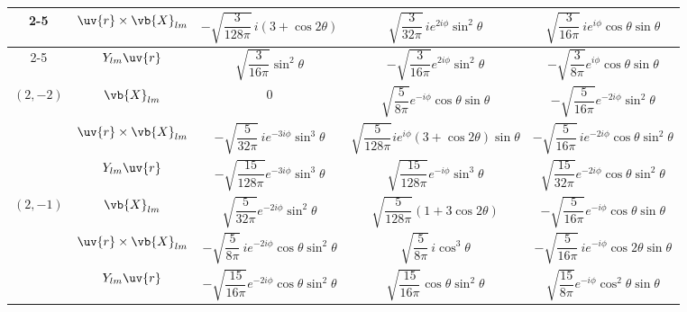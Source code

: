 \begin{longtable}{ccccc}
	\cmidrule(lr){2-5}
	          & \(\uv{r}\times\vb{X}_{lm}\) & \(-\sqrt{\dfrac{3}{128\pi}} \, i \left(3+\cos2\theta\right)\)                    & \(\sqrt{\dfrac{3}{32\pi}} \, i e^{2i\phi} \sin^2\theta\)                     & \(\sqrt{\dfrac{3}{16\pi}} \, i e^{i\phi} \cos\theta\sin\theta\)      \\
	\cmidrule(lr){2-5}
	          & \(Y_{lm}\uv{r}\)            & \(\sqrt{\dfrac{3}{16\pi}} \sin^2\theta\)                                         & \(-\sqrt{\dfrac{3}{16\pi}} e^{2i\phi} \sin^2\theta\)                         & \(-\sqrt{\dfrac{3}{8\pi}} e^{i\phi} \cos\theta\sin\theta\)           \\
	\midrule
	\multirow{3}{*}{\((2,-2)\)}
	          & \(\vb{X}_{lm}\)             & \(0\)                                                                            & \(\sqrt{\dfrac{5}{8\pi}} e^{-i\phi} \cos\theta \sin\theta\)                  & \(-\sqrt{\dfrac{5}{16\pi}} e^{-2i\phi} \sin^2\theta\)                \\
	\cmidrule(lr){2-5}
	          & \(\uv{r}\times\vb{X}_{lm}\) & \(-\sqrt{\dfrac{5}{32\pi}} \, i e^{-3i\phi} \sin^3\theta\)                       & \(\sqrt{\dfrac{5}{128\pi}}ie^{i\phi} \left(3+\cos2\theta\right)\sin\theta\)  & \(-\sqrt{\dfrac{5}{16\pi}} \, i e^{-2i\phi} \cos\theta\sin^2\theta\) \\
	\cmidrule(lr){2-5}
	          & \(Y_{lm}\uv{r}\)            & \(-\sqrt{\dfrac{15}{128\pi}} e^{-3i\phi} \sin^3\theta\)                          & \(\sqrt{\dfrac{15}{128\pi}} e^{-i\phi} \sin^3\theta\)                        & \(\sqrt{\dfrac{15}{32\pi}} e^{-2i\phi} \cos\theta\sin^2\theta\)      \\
	\midrule
	\multirow{3}{*}{\((2,-1)\)}
	          & \(\vb{X}_{lm}\)             & \(\sqrt{\dfrac{5}{32\pi}} e^{-2i\phi} \sin^2\theta\)                             & \(\sqrt{\dfrac{5}{128\pi}} \left(1+3\cos2\theta\right)\)                     & \(-\sqrt{\dfrac{5}{16\pi}} e^{-i\phi} \cos\theta \sin\theta\)        \\
	\cmidrule(lr){2-5}
	          & \(\uv{r}\times\vb{X}_{lm}\) & \(-\sqrt{\dfrac{5}{8\pi}} \, i e^{-2i\phi} \cos\theta\sin^2\theta\)              & \(\sqrt{\dfrac{5}{8\pi}} \, i \cos^3\theta\)                                 & \(-\sqrt{\dfrac{5}{16\pi}} \, i e^{-i\phi} \cos2\theta\sin\theta\)   \\
	\cmidrule(lr){2-5}
	          & \(Y_{lm}\uv{r}\)            & \(-\sqrt{\dfrac{15}{16\pi}} e^{-2i\phi} \cos\theta\sin^2\theta\)                 & \(\sqrt{\dfrac{15}{16\pi}} \cos\theta\sin^2\theta\)                          & \(\sqrt{\dfrac{15}{8\pi}} e^{-i\phi} \cos^2\theta\sin\theta\)        \\

\end{longtable}
